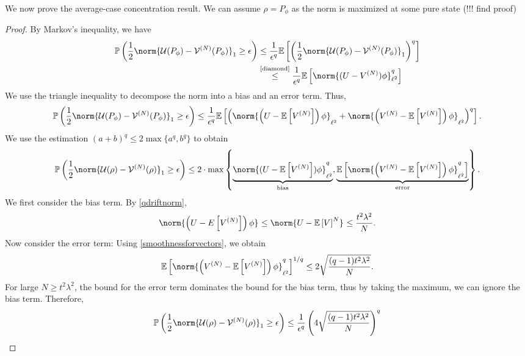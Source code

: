 We now prove the average-case concentration result.
We can assume \( \rho= P_{\phi} \) as the norm is maximized at some pure state (!!! find proof)
\begin{proof}
    By Markov's inequality, we have
    \begin{align*}
      \mathbb{P}\left(\frac{1}{2}\norm{\mathcal{U}(P_{\phi})-\mathcal{V}^{(N)}(P_{\phi})}_{1}\geq \epsilon\right) & \leq \frac{1}{\epsilon^{q}} \mathbb{E}\left[\left(\frac{1}{2} \norm{\mathcal{U}(P_{\phi})- \mathcal{V}^{(N)}(P_{\phi})}_{1}\right)^{q}\right] \\
                                                                                                          & \overset{\text{\ref{diamond}}}{\leq} \frac{1}{\epsilon^{q}} \mathbb{E}\left[\norm{(U-V^{(N)})\phi}_{\ell^{2}}^{q}\right]
    \end{align*}
    We use the triangle inequality to decompose the norm into a bias and an error term. Thus,
    \[ \mathbb{P}\left(\frac{1}{2}\norm{\mathcal{U}(P_{\phi})-\mathcal{V}^{(N)}(P_{\phi})}_{1}\geq \epsilon\right) \leq \frac{1}{\epsilon^{q}} \mathbb{E}\left[\left( \norm{\left(U-\mathbb{E}\left[V^{(N)}\right]\right)\phi }_{\ell^{2}}+ \norm{\left(V^{(N)}-\mathbb{E}\left[V^{(N)}\right]\right)\phi }_{\ell^{2}}\right)^{q}\right] .\]
    We use the estimation \( \left(a+b\right)^{q} \leq 2\max \{a^q,b^{q}\} \) to obtain
    \[ \mathbb{P}\left(\frac{1}{2}\norm{\mathcal{U}(\rho)-\mathcal{V}^{(N)}(\rho)}_{1}\geq \epsilon\right) \leq 2 \cdot \max_{} \left\{\underbrace{\norm{(U-\mathbb{E}\left[V^{(N)}\right])\phi }_{\ell^{2}}^{q}}_{\text{bias}},\underbrace{\mathbb{E}\left[ \norm{\left(V^{(N)}-\mathbb{E}\left[V^{(N)}\right]\right)\phi}_{\ell^{2}}^{q}\right] }_{\text{error}}   \right\} .\]
    We first consider the bias term. By \ref{qdriftnorm},
    \[ \norm{\left(U-E\left[V^{(N)}\right]\right)\phi }_{} \leq \norm{U-\mathbb{E}\left[V\right]^{N}}_{} \leq \frac{t^{2}\lambda^2}{N}. \]
    Now consider the error term: Using \ref{smoothnessforvectors}, we obtain
    \[ \mathbb{E}\left[\norm{\left(V^{(N)}-\mathbb{E}\left[V^{(N)}\right]\right) \phi}_{\ell^{2}}^{q}\right]^{1/q} \leq 2 \sqrt{\frac{(q-1)t^{2}\lambda^2}{N}} .\] 
    For large \( N \geq t^{2}\lambda^2\), the bound for the error term dominates the bound for the bias term, thus by taking the maximum, we can ignore the bias term. Therefore,
    \begin{align*}
      \mathbb{P}\left(\frac{1}{2}\norm{\mathcal{U}(\rho)-\mathcal{V}^{(N)}(\rho)}_{1}\geq \epsilon\right) &\leq \frac{1}{\epsilon^{q}}\left(4 \sqrt{\frac{(q-1)t^2 \lambda^2}{N}}\right)^{q} \\

\end{align*}
\end{proof}
